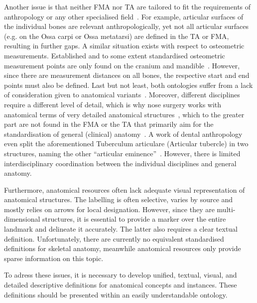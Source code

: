 \documentclass[sw]{iosart2x}
\begin{document}
Another issue is that neither FMA nor TA are tailored to fit the requirements of anthropology or any other specialised field~\citep{fma}.
For example, articular surfaces of the individual bones are relevant anthropologically, yet not all articular surfaces (e.g. on the Ossa carpi or Ossa metatarsi) are defined in the TA or FMA, resulting in further gaps.
A similar situation exists with respect to osteometric measurements.
Established and to some extent standardised osteometric measurement points are only found on the cranium and mandible~\citep{wesenanthropologie}.
 However, since there are measurement distances on all bones, the respective start and end points must also be defined.
Last but not least, both ontologies suffer from a lack of consideration given to anatomical variants~\citep{anatomycontribution}.
Moreover, different disciplines require a different level of detail, which is why nose surgery works with anatomical terms of very detailed anatomical structures~\citep{graysanatomy},
which to the greater part are not found in the FMA or the TA that primarily aim for the standardisation of general (clinical) anatomy~\citep{fma}.
A work of dental anthropology even split the aforementioned Tuberculum articulare (Articular tubercle) in two structures, naming the other \enquote{articular eminence}~\citep{dentalanthropology}.
However, there is limited interdisciplinary coordination between the individual disciplines and general anatomy.

Furthermore, anatomical resources often lack adequate visual representation of anatomical structures.
The labelling is often selective, varies by source and mostly relies on arrows for local designation.
However, since they are multi-dimensional structures, it is essential to provide a marker over the entire landmark and delineate it accurately.
The latter also requires a clear textual definition.
Unfortunately, there are currently no equivalent standardised definitions for skeletal anatomy, meanwhile anatomical resources only provide sparse information on this topic.

To adress these issues, it is necessary to develop unified, textual, visual, and detailed descriptive definitions for anatomical concepts and instances.
These definitions should be presented within an easily understandable ontology.
\end{document}
